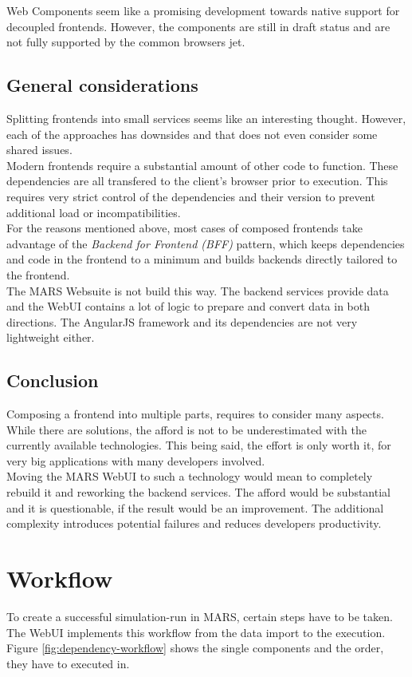 Web Components seem like a promising development towards native support for decoupled frontends. However, the components are still in draft status and are not fully supported by the common browsers jet.


\subsection{General considerations}
Splitting frontends into small services seems like an interesting thought. However, each of the approaches has downsides and that does not even consider some shared issues.\\
Modern frontends require a substantial amount of other code to function. These dependencies are all transfered to the client's browser prior to execution. This requires very strict control of the dependencies and their version to prevent additional load or incompatibilities.\\
For the reasons mentioned above, most cases of composed frontends take advantage of the \textit{Backend for Frontend (BFF)} pattern, which keeps dependencies and code in the frontend to a minimum and builds backends directly tailored to the frontend.\\
The MARS Websuite is not build this way. The backend services provide data and the WebUI contains a lot of logic to prepare and convert data in both directions. The AngularJS framework and its dependencies are not very lightweight either.\\


\subsection{Conclusion}
Composing a frontend into multiple parts, requires to consider many aspects. While there are solutions, the afford is not to be underestimated with the currently available technologies. This being said, the effort is only worth it, for very big applications with many developers involved.\\
Moving the MARS WebUI to such a technology would mean to completely rebuild it and reworking the backend services. The afford would be substantial and it is questionable, if the result would be an improvement. The additional complexity introduces potential failures and reduces developers productivity.



\section{Workflow}
To create a successful simulation-run in MARS, certain steps have to be taken. The WebUI implements this workflow from the data import to the execution. Figure \ref{fig:dependency-workflow} shows the single components and the order, they have to executed in.

